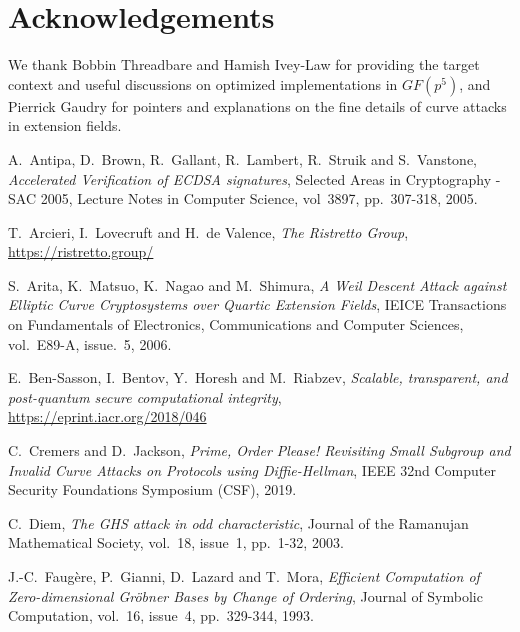 \documentclass{llncs}
\newcommand{\GF}{GF}
\begin{document}
\section*{Acknowledgements}

We thank Bobbin Threadbare and Hamish Ivey-Law for providing the target
context and useful discussions on optimized implementations in
$\GF(p^5)$, and Pierrick Gaudry for pointers and explanations on the
fine details of curve attacks in extension fields.

\begin{thebibliography}{20}

\RaggedRight

A.~Antipa, D.~Brown, R.~Gallant, R.~Lambert, R.~Struik and S.~Vanstone,
\emph{Accelerated Verification of ECDSA signatures},
Selected Areas in Cryptography - SAC 2005, Lecture Notes in Computer
Science, vol~3897, pp.~307-318, 2005.

T.~Arcieri, I.~Lovecruft and H.~de Valence,
\emph{The Ristretto Group},\\
\url{https://ristretto.group/}

S.~Arita, K.~Matsuo, K.~Nagao and M.~Shimura,
\emph{A Weil Descent Attack against Elliptic Curve Cryptosystems over
Quartic Extension Fields},
IEICE Transactions on Fundamentals of Electronics, Communications and
Computer Sciences, vol.~E89-A, issue.~5, 2006.

E.~Ben-Sasson, I.~Bentov, Y.~Horesh and M.~Riabzev,
\emph{Scalable, transparent, and post-quantum secure computational integrity},\\
\url{https://eprint.iacr.org/2018/046}

C.~Cremers and D.~Jackson,
\emph{Prime, Order Please! Revisiting Small Subgroup and Invalid Curve
Attacks on Protocols using Diffie-Hellman},
IEEE 32nd Computer Security Foundations Symposium (CSF), 2019.

C.~Diem,
\emph{The GHS attack in odd characteristic},
Journal of the Ramanujan Mathematical Society, vol.~18, issue~1,
pp.~1-32, 2003.

J.-C.~Faugère, P.~Gianni, D.~Lazard and T.~Mora,
\emph{Efficient Computation of Zero-dimensional Gröbner Bases by Change
of Ordering},
Journal of Symbolic Computation, vol.~16, issue~4, pp.~329-344, 1993.


\end{thebibliography}
\end{document}
